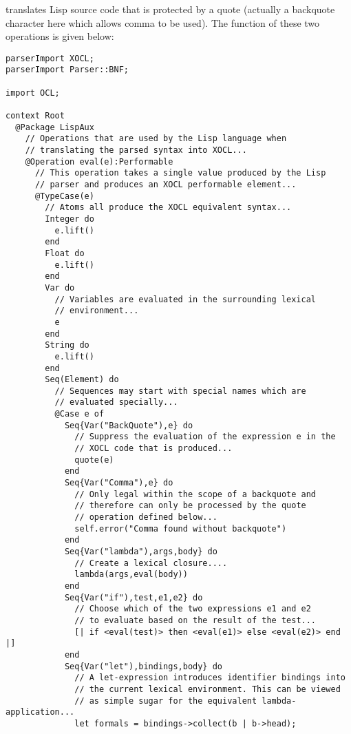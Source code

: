 translates Lisp source code that is protected by a quote (actually
a backquote character here which allows comma to be used). The 
function of these two operations is given below:
\begin{lstlisting}
parserImport XOCL;
parserImport Parser::BNF;

import OCL;
  
context Root
  @Package LispAux  
    // Operations that are used by the Lisp language when
    // translating the parsed syntax into XOCL...    
    @Operation eval(e):Performable    
      // This operation takes a single value produced by the Lisp
      // parser and produces an XOCL performable element...      
      @TypeCase(e)      
        // Atoms all produce the XOCL equivalent syntax...       
        Integer do
          e.lift()
        end        
        Float do
          e.lift()
        end        
        Var do        
          // Variables are evaluated in the surrounding lexical
          // environment...         
          e
        end        
        String do
          e.lift()
        end        
        Seq(Element) do        
          // Sequences may start with special names which are
          // evaluated specially...         
          @Case e of          
            Seq{Var("BackQuote"),e} do           
              // Suppress the evaluation of the expression e in the
              // XOCL code that is produced...             
              quote(e)
            end           
            Seq{Var("Comma"),e} do          
              // Only legal within the scope of a backquote and 
              // therefore can only be processed by the quote
              // operation defined below...              
              self.error("Comma found without backquote")
            end            
            Seq{Var("lambda"),args,body} do             
              // Create a lexical closure....             
              lambda(args,eval(body))
            end           
            Seq{Var("if"),test,e1,e2} do           
              // Choose which of the two expressions e1 and e2
              // to evaluate based on the result of the test...             
              [| if <eval(test)> then <eval(e1)> else <eval(e2)> end |]
            end           
            Seq{Var("let"),bindings,body} do           
              // A let-expression introduces identifier bindings into
              // the current lexical environment. This can be viewed
              // as simple sugar for the equivalent lambda-application...              
              let formals = bindings->collect(b | b->head);

\end{lstlisting}
